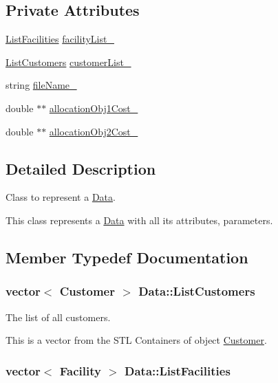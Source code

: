 \subsection*{\-Private \-Attributes}
\begin{DoxyCompactItemize}
\item 
\hyperlink{classData_a63d34805405ed1b64c868cd5ef7267ef}{\-List\-Facilities} \hyperlink{classData_a32e37fbe47067762b6412955f8670ba5}{facility\-List\-\_\-}
\item 
\hyperlink{classData_a3252caf2ec3ffeb972647e9e2f005bea}{\-List\-Customers} \hyperlink{classData_a2c241adf75d61538b75a383b5432b5f4}{customer\-List\-\_\-}
\item 
string \hyperlink{classData_ab7f03877c05f051285208059a6be5c69}{file\-Name\-\_\-}
\item 
double $\ast$$\ast$ \hyperlink{classData_a28bb6f7481882d1b3547b1c040ee6707}{allocation\-Obj1\-Cost\-\_\-}
\item 
double $\ast$$\ast$ \hyperlink{classData_a3606ed9ae6bfba092ceab4ea0af9bfd1}{allocation\-Obj2\-Cost\-\_\-}
\end{DoxyCompactItemize}


\subsection{\-Detailed \-Description}
\-Class to represent a {\ttfamily \hyperlink{classData}{\-Data}}. 

\-This class represents a {\ttfamily \hyperlink{classData}{\-Data}} with all its attributes, parameters. 

\subsection{\-Member \-Typedef \-Documentation}
\hypertarget{classData_a3252caf2ec3ffeb972647e9e2f005bea}{
\subsubsection[{\-List\-Customers}]{\setlength{\rightskip}{0pt plus 5cm}vector$<$ {\bf \-Customer} $>$ {\bf \-Data\-::\-List\-Customers}}}\label{classData_a3252caf2ec3ffeb972647e9e2f005bea}


\-The list of all customers. 

\-This is a vector from the \-S\-T\-L \-Containers of object {\ttfamily \hyperlink{classCustomer}{\-Customer}}. \hypertarget{classData_a63d34805405ed1b64c868cd5ef7267ef}{
\subsubsection[{\-List\-Facilities}]{\setlength{\rightskip}{0pt plus 5cm}vector$<$ {\bf \-Facility} $>$ {\bf \-Data\-::\-List\-Facilities}}}\label{classData_a63d34805405ed1b64c868cd5ef7267ef}


